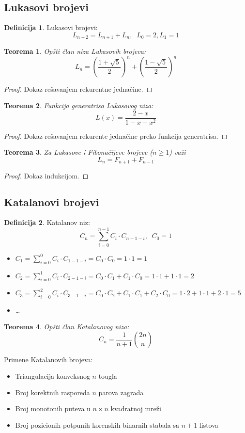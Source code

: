 \documentclass[a4paper,12pt]{article}
\numberwithin{algorithm}{section}
\theoremstyle{plain}
\newtheorem{theorem}{Teorema}[section]
\theoremstyle{definition}
\newtheorem{definition}{Definicija}[section]
\theoremstyle{remark}
\begin{document}
\subsection{Lukasovi brojevi}
\begin{definition}
    Lukasovi brojevi:
    \[ L_{n+2} = L_{n+1} + L_n, \;\; L_0 = 2, L_1 = 1 \]
\end{definition}
\begin{theorem}
    Opšti član niza Lukasovih brojeva:
    \[ L_n = \left( \frac{1 + \sqrt{5}}{2} \right)^n + \left( \frac{1 - \sqrt{5}}{2} \right)^n \]
\end{theorem}
\begin{proof}
    Dokaz rešavanjem rekurentne jednačine.
\end{proof}
\begin{theorem}
    Funkcija generatrisa Lukasovog niza:
    \[
        L(x) = \frac{2-x}{1-x-x^2}
    \]
\end{theorem}
\begin{proof}
    Dokaz rešavanjem rekurente jednačine preko funkcija generatrisa.
\end{proof}
\begin{theorem}
    Za Lukasove i Fibonačijeve brojeve ($n \geq 1$) važi
    \[ L_n = F_{n+1} + F_{n-1} \]
\end{theorem}
\begin{proof}
    Dokaz indukcijom.
\end{proof}
\subsection{Katalanovi brojevi}
\begin{definition}
    Katalanov niz:
    \[ C_n = \sum_{i=0}^{n-1}C_i \cdot C_{n-1-i},\;\; C_0 = 1 \]
\end{definition}
\begin{itemize}
    \item $C_1 = \sum_{i=0}^{0} C_i \cdot C_{1-1-i} = C_0 \cdot C_0 = 1 \cdot 1 = 1$
    \item $C_2 = \sum_{i=0}^{1} C_i \cdot C_{2-1-i} = C_0 \cdot C_1 + C_1 \cdot C_0 = 1 \cdot 1 + 1 \cdot 1 = 2$
    \item $C_3 = \sum_{i=0}^{2} C_i \cdot C_{3-1-i} = C_0 \cdot C_2 + C_1 \cdot C_1 + C_2 \cdot C_0 = 1 \cdot 2 + 1 \cdot 1 + 2 \cdot 1 = 5$
    \item \dots
\end{itemize}
\begin{theorem}
    Opšti član Katalanovog niza:
    \[ C_n = \frac{1}{n+1} {{2n} \choose n} \]
\end{theorem}
Primene Katalanovih brojeva:
\begin{itemize}
    \item Triangulacija konveksnog $n$-tougla
    \item Broj korektnih rasporeda $n$ parova zagrada
    \item Broj monotonih puteva u $n \times n$ kvadratnoj mreži
    \item Broj pozicionih potpunih korenskih binarnih stabala sa $n+1$ listova
\end{itemize}
\newpage
\end{document}
